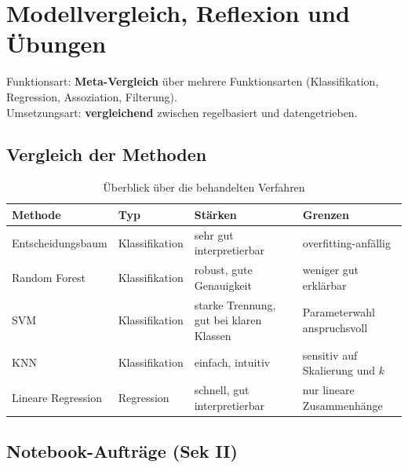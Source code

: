 \chapter{Modellvergleich, Reflexion und Übungen}

\begin{myremark}
Funktionsart: \textbf{Meta-Vergleich} über mehrere Funktionsarten (Klassifikation, Regression, Assoziation, Filterung). \\
Umsetzungsart: \textbf{vergleichend} zwischen regelbasiert und datengetrieben.
\end{myremark}

\section{Vergleich der Methoden}

\begin{table}[H]
\centering
\small
\begin{tabular}{p{2.8cm}p{2.4cm}p{3.4cm}p{3.4cm}}
\toprule
\textbf{Methode} & \textbf{Typ} & \textbf{Stärken} & \textbf{Grenzen} \\
\midrule
Entscheidungsbaum & Klassifikation & sehr gut interpretierbar & overfitting-anfällig \\
\midrule
Random Forest & Klassifikation & robust, gute Genauigkeit & weniger gut erklärbar \\
\midrule
SVM & Klassifikation & starke Trennung, gut bei klaren Klassen & Parameterwahl anspruchsvoll \\
\midrule
KNN & Klassifikation & einfach, intuitiv & sensitiv auf Skalierung und \(k\) \\
\midrule
Lineare Regression & Regression & schnell, gut interpretierbar & nur lineare Zusammenhänge \\
\bottomrule
\end{tabular}
\caption{Überblick über die behandelten Verfahren}
\label{tab:modelle-15}
\end{table}

\section{Notebook-Aufträge (Sek II)}


